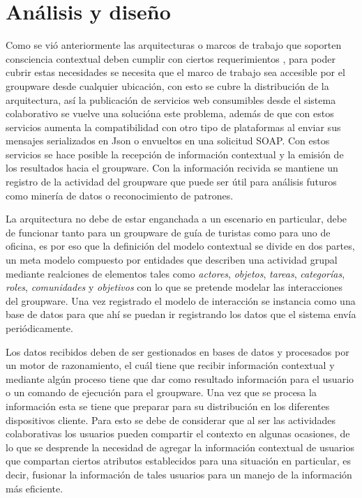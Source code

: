 
\section{An\'alisis y dise\~no}

Como se vi\'o anteriormente las arquitecturas o marcos de trabajo que soporten consciencia contextual deben cumplir con ciertos requerimientos \cite{dey1999architecture}, para poder cubrir estas necesidades se necesita que el marco de trabajo sea accesible por el groupware desde cualquier ubicaci\'on, con esto se cubre la distribuci\'on de la arquitectura, as\'i la publicaci\'on de servicios web consumibles desde el sistema colaborativo se vuelve una soluci\'ona este problema, adem\'as de que con estos servicios aumenta la compatibilidad con otro tipo de plataformas al enviar sus mensajes serializados en Json o envueltos en una solicitud SOAP. Con estos servicios se hace posible la recepci\'on de informaci\'on contextual y la emisi\'on de los resultados hacia el groupware. Con la informaci\'on recivida se mantiene un registro de la actividad del groupware que puede ser \'util para an\'alisis futuros como miner\'ia de datos o reconocimiento de patrones.

La arquitectura no debe de estar enganchada a un escenario en particular, debe de funcionar tanto para un groupware de gu\'ia de turistas como para uno de oficina, es por eso que la definici\'on del modelo contextual se divide en dos partes, un meta modelo compuesto por entidades que describen una actividad grupal mediante realciones de elementos tales como \textit{actores}, \textit{objetos}, \textit{tareas}, \textit{categor\'ias}, \textit{roles}, \textit{comunidades} y \textit{objetivos} con lo que se pretende modelar las interacciones del groupware. Una vez registrado el modelo de interacci\'on se instancia como una base de datos para que ah\'i se puedan ir registrando los datos que el sistema env\'ia peri\'odicamente.

Los datos recibidos deben de ser gestionados en bases de datos y procesados por un motor de razonamiento, el cu\'al tiene que recibir informaci\'on contextual y mediante alg\'un proceso tiene que dar como resultado informaci\'on para el usuario o un comando de ejecuci\'on para el groupware. Una vez que se procesa la informaci\'on esta se tiene que preparar para su distribuci\'on en los diferentes dispositivos cliente. Para esto se debe de considerar que al ser las actividades colaborativas los usuarios pueden compartir el contexto en algunas ocasiones, de lo que se desprende la necesidad de agregar la informaci\'on contextual de usuarios que compartan ciertos atributos establecidos para una situaci\'on en particular, es decir, fusionar la informaci\'on de tales usuarios para un manejo de la informaci\'on m\'as eficiente.

